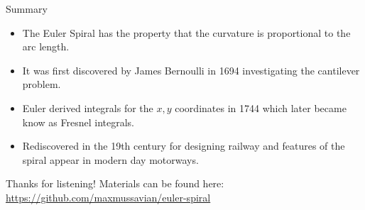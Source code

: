\documentclass{beamer}
\begin{document}
\begin{frame}{Summary}
	\begin{itemize}
		\item The Euler Spiral has the property that the curvature is proportional to the arc length.
		\item It was first discovered by James Bernoulli in 1694 investigating the cantilever problem.
		\item Euler derived integrals for the $x,y$ coordinates in 1744 which later became know as Fresnel integrals.
		\item Rediscovered in the 19th century for designing railway and features of the spiral appear in modern day motorways.
	\end{itemize}
\end{frame}

\begin{frame}
	\centering
	Thanks for listening!
	\linebreak
	\linebreak
	Materials can be found here:
	\href{https://github.com/maxmussavian/euler-spiral}{https://github.com/maxmussavian/euler-spiral}
\end{frame}
\end{document}
